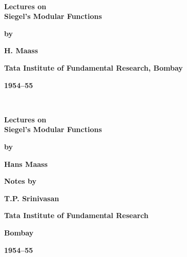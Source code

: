 ~\phantom{a}
\thispagestyle{empty}
\begin{center}
{\Large\bf Lectures on}\\[5pt] 
{\Large\bf Siegel's Modular Functions}
\vskip 1cm


{\large\bf by}
\medskip

{\large\bf H. Maass}
\vfill 


{\bf Tata Institute of Fundamental Research, Bombay}
\medskip

{\bf 1954--55}
\end{center}
\newpage

~\phantom{a}
\thispagestyle{empty}
\begin{center}
{\Large\bf Lectures on}\\[5pt] 
{\Large\bf Siegel's Modular Functions}
\vskip 1cm


{\large\bf by}
\medskip

{\large\bf Hans Maass}
\vfill



{\large\bf Notes by}
\medskip

{\Large\bf T.P. Srinivasan}

\vfill






{\bf Tata Institute of Fundamental Research}

{\bf Bombay}

{\bf 1954--55}
\end{center}
